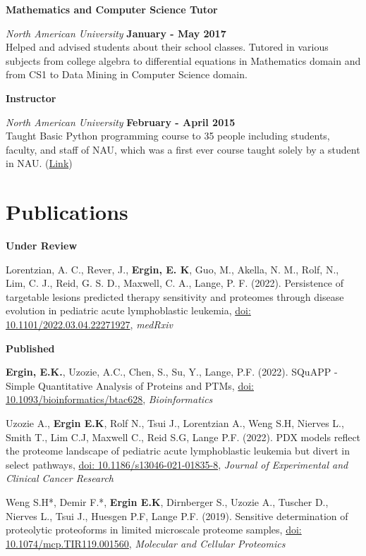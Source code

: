 \documentclass[margin,line]{res}
\begin{document}
\begin{resume}
{\bf Mathematics and Computer Science Tutor}
\vspace{-.1cm}

{\em North American University} \hfill {\bf January - May 2017}\\
Helped and advised students about their school classes. Tutored in various subjects from college algebra to differential equations in Mathematics domain and from CS1 to Data Mining in Computer Science domain.

{\bf Instructor}
\vspace{-.1cm}

{\em North American University} \hfill {\bf February - April 2015}\\
Taught Basic Python programming course to 35 people including students, faculty, and staff of NAU, which was a first ever course taught solely by a student in NAU. (\href{https://github.com/NAU-Python-Class/Py101-Spring-15}{Link})


\section{\sc Publications}
{\bf Under Review}

\vspace*{-.3cm}
Lorentzian, A. C., Rever, J., {\bf Ergin, E. K}, Guo, M., Akella, N. M., Rolf, N., Lim, C. J., Reid, G. S. D., Maxwell, C. A., Lange, P. F. (2022). Persistence of targetable lesions predicted therapy sensitivity and proteomes through disease evolution in pediatric acute lymphoblastic leukemia, \href{https://doi.org/10.1101/2022.03.04.22271927}{doi: 10.1101/2022.03.04.22271927}, {\em medRxiv}

{\bf Published}

\vspace*{-.3cm}
{\bf Ergin, E.K.}, Uzozie, A.C., Chen, S., Su, Y., Lange, P.F. (2022). SQuAPP - Simple Quantitative Analysis of Proteins and PTMs, \href{https://doi.org/10.1093/bioinformatics/btac628}{doi: 10.1093/bioinformatics/btac628}, {\em Bioinformatics}

Uzozie A., {\bf Ergin E.K}, Rolf N., Tsui J., Lorentzian A., Weng S.H,  Nierves L., Smith T., Lim C.J,  Maxwell C., Reid S.G, Lange P.F. (2022). PDX models reflect the proteome landscape of pediatric acute lymphoblastic leukemia but divert in select pathways, \href{https://dx.doi.org/10.1186%2Fs13046-021-01835-8}{doi: 10.1186/s13046-021-01835-8}, {\em Journal of Experimental and Clinical Cancer Research}

Weng S.H*, Demir F.*, {\bf Ergin E.K}, Dirnberger S., Uzozie A., Tuscher D., Nierves L., Tsui J., Huesgen P.F, Lange P.F. (2019). Sensitive determination of proteolytic proteoforms in limited microscale proteome samples, \href{https://doi.org/10.1074/mcp.TIR119.001560}{doi: 10.1074/mcp.TIR119.001560}, {\em Molecular and Cellular Proteomics}


\end{resume}
\end{document}
